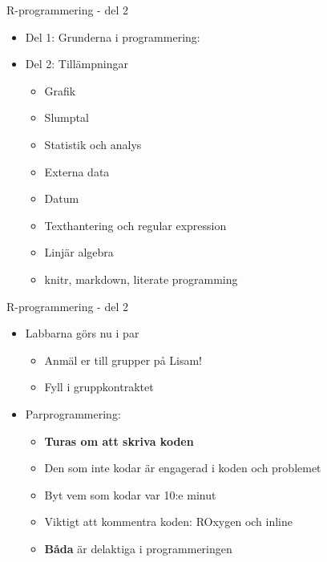 \documentclass[
  11pt,
  ignorenonframetext,
  handout]{beamer}
\providecommand{\tightlist}{%
  \setlength{\itemsep}{0pt}\setlength{\parskip}{0pt}}
\newcommand\imp[1]{\alert{\textbf{#1}}}
\begin{document}
\begin{frame}{R-programmering - del 2}
\protect{}\label{r-programmering---del-2-1}
\begin{itemize}
\tightlist
\item
  Del 1: Grunderna i programmering:
\item
  Del 2: Tillämpningar

  \begin{itemize}
  \tightlist
  \item
    Grafik
  \item
    Slumptal
  \item
    Statistik och analys
  \item
    Externa data
  \item
    Datum
  \item
    Texthantering och regular expression
  \item
    Linjär algebra
  \item
    knitr, markdown, literate programming
  \end{itemize}
\end{itemize}
\end{frame}

\begin{frame}{R-programmering - del 2}
\protect{}\label{r-programmering---del-2-2}
\begin{itemize}
\tightlist
\item
  Labbarna görs nu i par

  \begin{itemize}
  \tightlist
  \item
    Anmäl er till grupper på Lisam!
  \item
    Fyll i gruppkontraktet
  \end{itemize}
\item
  Parprogrammering:

  \begin{itemize}
  \item
    \imp{Turas om att skriva koden}
  \item
    Den som inte kodar är engagerad i koden och problemet
  \item
    Byt vem som kodar var 10:e minut
  \item
    Viktigt att kommentra koden: ROxygen och inline
  \item
    \imp{Båda} är delaktiga i programmeringen
  \end{itemize}
\end{itemize}
\end{frame}
\end{document}
